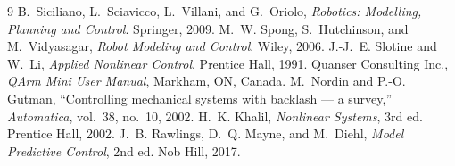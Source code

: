 \documentclass[conference]{IEEEtran}
\begin{document}

\begin{thebibliography}{9}
 B.~Siciliano, L.~Sciavicco, L.~Villani, and G.~Oriolo, \emph{Robotics: Modelling, Planning and Control}. Springer, 2009.
 M.~W. Spong, S.~Hutchinson, and M.~Vidyasagar, \emph{Robot Modeling and Control}. Wiley, 2006.
 J.-J.~E. Slotine and W.~Li, \emph{Applied Nonlinear Control}. Prentice Hall, 1991.
 Quanser Consulting Inc., \emph{QArm Mini User Manual}, Markham, ON, Canada.
 M.~Nordin and P.-O. Gutman, ``Controlling mechanical systems with backlash --- a survey,'' \emph{Automatica}, vol.~38, no.~10, 2002.
 H.~K. Khalil, \emph{Nonlinear Systems}, 3rd ed. Prentice Hall, 2002.
 J.~B. Rawlings, D.~Q. Mayne, and M.~Diehl, \emph{Model Predictive Control}, 2nd ed. Nob Hill, 2017.
\end{thebibliography}
\end{document}
